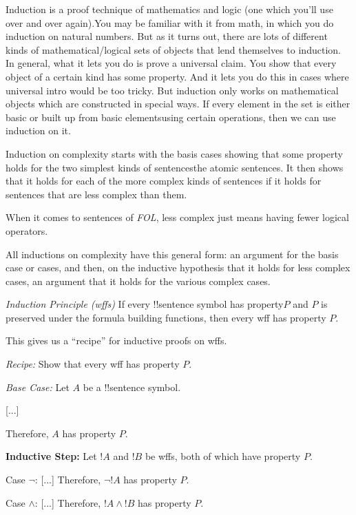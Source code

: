 \documentclass[../../../include/open-logic-section]{subfiles}
\begin{document}

\begin{explain}
Induction is a proof technique of mathematics and logic (one which
you'll use over and over again).You may be familiar with it from math, in
which you do induction on natural numbers. But as it turns out, there are
lots of different kinds of mathematical/logical sets of objects that lend
themselves to induction. In general, what it lets you do is prove a
universal claim. You show that every object of a certain kind has some
property. And it lets you do this in cases where universal intro would be
too tricky. But induction only works on mathematical objects which are
constructed in special ways.
If every element in the set is either basic or built up from basic
elementsusing certain operations, then we can use induction on it.

Induction on complexity starts with the basis cases showing that some
property holds for the two simplest kinds of sentences\textemdash the
atomic sentences. It then shows that it holds for each of the more complex
kinds of sentences if it holds for sentences that are less complex than
them.

When it comes to sentences of \emph{FOL}, less complex just means having
fewer logical operators.

All inductions on complexity have this general form: an argument for the
basis case or cases, and then, on the inductive hypothesis that it holds
for less complex cases, an argument that it holds for the various complex
cases.

\emph{Induction Principle (wffs)} If every !!{sentence} symbol has
property$P$ and $P$ is preserved under the formula building functions, then
every
wff has property $P$.

This gives us a ``recipe'' for inductive proofs on wffs.

\emph{Recipe:} Show that every wff has property $P$.

\emph{Base Case:} Let $A$ be a !!{sentence} symbol.

[...]

Therefore, $A$ has property $P$.

\textbf{Inductive Step:} Let $!A$ and $!B$ be wffs, both of which have
property $P$.

Case $\lnot$: [...] Therefore, $\lnot !A$ has property $P$.

Case $\land$: [...] Therefore, $!A \land !B$ has property $P$.


\end{explain}
\end{document}
